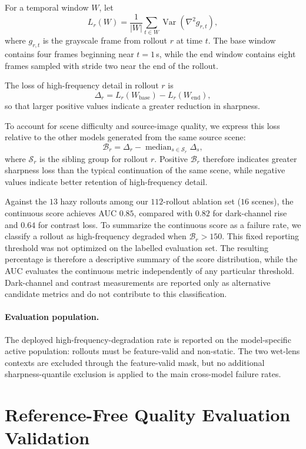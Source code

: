 \documentclass[letterpaper]{article} %
\begin{document}
For a temporal window \(W\), let
\[
L_r(W)
=
\frac{1}{|W|}
\sum_{t\in W}
\operatorname{Var}\!\left(\nabla^2 g_{r,t}\right),
\]
where \(g_{r,t}\) is the grayscale frame from rollout \(r\) at time \(t\).
The base window contains four frames beginning near \(t=1\)\,s, while the
end window contains eight frames sampled with stride two near the end of the
rollout.

The loss of high-frequency detail in rollout \(r\) is
\[
\Delta_r
=
L_r(W_{\mathrm{base}})
-
L_r(W_{\mathrm{end}}),
\]
so that larger positive values indicate a greater reduction in sharpness.

To account for scene difficulty and source-image quality, we express this
loss relative to the other models generated from the same source scene:
\[
\mathcal B_r
=
\Delta_r
-
\operatorname{median}_{s\in\mathcal S_r}\Delta_s,
\]
where \(\mathcal S_r\) is the sibling group for rollout \(r\). Positive
\(\mathcal B_r\) therefore indicates greater sharpness loss than the typical
continuation of the same scene, while negative values indicate better
retention of high-frequency detail.

Against the $13$ hazy rollouts among our $112$-rollout ablation set ($16$ scenes),
the continuous score achieves AUC $0.85$, compared with $0.82$ for dark-channel
rise and $0.64$ for contrast loss. To summarize the continuous score as a failure rate, we classify a rollout as
high-frequency degraded when $\mathcal B_r>150$. This fixed reporting
threshold was not optimized on the labelled evaluation set. The resulting
percentage is therefore a descriptive summary of the score distribution,
while the AUC evaluates the continuous metric independently of any particular
threshold. Dark-channel and contrast measurements are reported only as
alternative candidate metrics and do not contribute to this classification.

\paragraph{Evaluation population.}
The deployed high-frequency-degradation rate is reported on the model-specific
active population: rollouts must be feature-valid and non-static. The two
wet-lens contexts are excluded through the feature-valid mask, but no
additional sharpness-quantile exclusion is applied to the main cross-model
failure rates.

\section{Reference-Free Quality Evaluation Validation}
\label{app:quality_validation}
\end{document}
